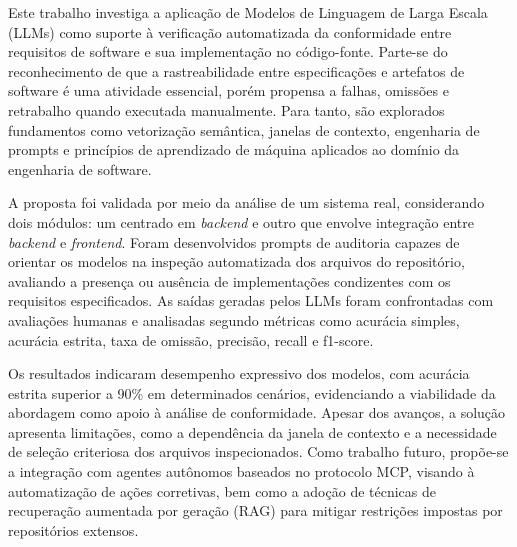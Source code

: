 Este trabalho investiga a aplicação de Modelos de Linguagem de Larga Escala (LLMs) como suporte à verificação automatizada da conformidade entre requisitos de software e sua implementação no código-fonte. Parte-se do reconhecimento de que a rastreabilidade entre especificações e artefatos de software é uma atividade essencial, porém propensa a falhas, omissões e retrabalho quando executada manualmente. Para tanto, são explorados fundamentos como vetorização semântica, janelas de contexto, engenharia de prompts e princípios de aprendizado de máquina aplicados ao domínio da engenharia de software.

A proposta foi validada por meio da análise de um sistema real, considerando dois módulos: um centrado em \textit{backend} e outro que envolve integração entre \textit{backend} e \textit{frontend}. Foram desenvolvidos prompts de auditoria capazes de orientar os modelos na inspeção automatizada dos arquivos do repositório, avaliando a presença ou ausência de implementações condizentes com os requisitos especificados. As saídas geradas pelos LLMs foram confrontadas com avaliações humanas e analisadas segundo métricas como acurácia simples, acurácia estrita, taxa de omissão, precisão, recall e f1-score.

Os resultados indicaram desempenho expressivo dos modelos, com acurácia estrita superior a 90\% em determinados cenários, evidenciando a viabilidade da abordagem como apoio à análise de conformidade. Apesar dos avanços, a solução apresenta limitações, como a dependência da janela de contexto e a necessidade de seleção criteriosa dos arquivos inspecionados. Como trabalho futuro, propõe-se a integração com agentes autônomos baseados no protocolo MCP, visando à automatização de ações corretivas, bem como a adoção de técnicas de recuperação aumentada por geração (RAG) para mitigar restrições impostas por repositórios extensos.
